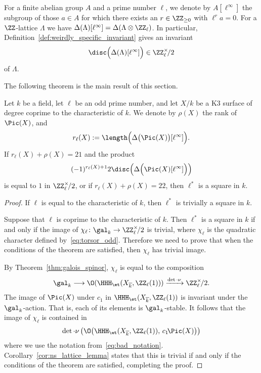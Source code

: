 For a finite abelian group $A$ and a prime number $\ell$, we denote by $A[\ell^{\infty}]$ the subgroup of those $a \in A$ for which there exists an $r \in \ZZ_{\geq 0}$ with $\ell^r a = 0$. For a $\ZZ$-lattice $\Lambda$ we have $\Delta(\Lambda)[\ell^{\infty}] = \Delta(\Lambda \otimes \ZZ_{\ell})$. In particular, Definition~\ref{def:weirdly_specific_invariant} gives an invariant 
$$
\disc\Big(\Delta(\Lambda)[\ell^{\infty}]\Big) \in \ZZ_{\ell}^{\times}\!/2
$$
of $\Lambda$.

The following theorem is the main result of this section.
\begin{theorem}\label{thm:main_thm_ns}
Let $k$ be a field, let $\ell$ be an odd prime number, and let $X/k$ be a K3 surface of degree coprime to the characteristic of $k$. We denote by $\rho(X)$ the rank of $\Pic(X)$, and 
$$
r_{\ell}(X) := \length\Big(\Delta\big(\Pic(X)\big)[\ell^{\infty}]\Big).
$$
If $r_{\ell}(X) + \rho(X) = 21$ and the product
$$
    (-1)^{r_{\ell}(X)+1} 2 \disc\Big(\Delta\Big(\Pic(X)[\ell^{\infty}]\Big)\Big)
$$
    is equal to $1$ in $\ZZ_{\ell}^{\times}\!/2$, or if $r_{\ell}(X) + \rho(X) = 22$, then $\ell^*$ is a square in $k$.
\end{theorem}
\begin{proof}
If $\ell$ is equal to the characteristic of $k$, then $\ell^*$ is trivially a square in $k$.

Suppose that $\ell$ is coprime to the characteristic of $k$. Then $\ell^*$ is a square in $k$ if and only if the image of $\chi_{\ell}\colon \gal_k \rightarrow \ZZ_{\ell}^{\times}\!/2$ is trivial, where $\chi_{\ell}$ is the quadratic character defined by~\eqref{eq:torsor_odd}. Therefore we need to prove that when the conditions of the theorem are satisfied, then $\chi_{\ell}$ has trivial image. 

By Theorem~\ref{thm:galois_spinor}, $\chi_{\ell}$ is equal to the composition
$$
\gal_k \longrightarrow \O(\HHH_{\et}(X_{\overline{k}}, \ZZ_{\ell}(1))) \xrightarrow{\det \cdot \nu} \ZZ_{\ell}^{\times}\!/2.
$$
The image of $\Pic(X)$ under $c_1$ in $\HHH_{\et}(X_{\overline{k}}, \ZZ_{\ell}(1))$ is invariant under the $\gal_k$-action. That is, each of its elements is $\gal_k$-stable. It follows that the image of $\chi_{\ell}$ is contained in
$$
\det \cdot \nu\left(\O\!\left(\HHH_{\et}(X_{\overline{k}}, \ZZ_{\ell}(1)),\, c_1\!\Pic(X)\right)\right)
$$
where we use the notation from~\eqref{eq:bad_notation}. Corollary~\ref{cor:ns_lattice_lemma} states that this is trivial if and only if the conditions of the theorem are satisfied, completing the proof.
\end{proof}

